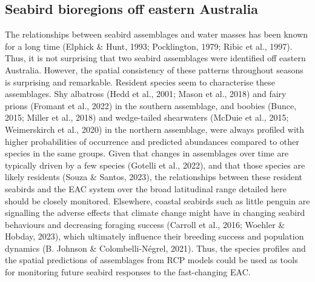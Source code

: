 \documentclass{article}
\begin{document}
\begin{linenumbers}
\hypertarget{seabird-bioregions-off-eastern-australia}{%
\subsection{Seabird bioregions off eastern Australia}\label{seabird-bioregions-off-eastern-australia}}

The relationships between seabird assemblages and water masses has been known for a long time (Elphick \& Hunt, 1993; Pocklington, 1979; Ribic et al., 1997). Thus, it is not surprising that two seabird assemblages were identified off eastern Australia. However, the spatial consistency of these patterns throughout seasons is surprising and remarkable. Resident species seem to characterise these assemblages. Shy albatross (Hedd et al., 2001; Mason et al., 2018) and fairy prions (Fromant et al., 2022) in the southern assemblage, and boobies (Bunce, 2015; Miller et al., 2018) and wedge-tailed shearwaters (McDuie et al., 2015; Weimerskirch et al., 2020) in the northern assemblage, were always profiled with higher probabilities of occurrence and predicted abundances compared to other species in the same groups. Given that changes in assemblages over time are typically driven by a few species (Gotelli et al., 2022), and that those species are likely residents (Souza \& Santos, 2023), the relationships between these resident seabirds and the EAC system over the broad latitudinal range detailed here should be closely monitored. Elsewhere, coastal seabirds such as little penguin are signalling the adverse effects that climate change might have in changing seabird behaviours and decreasing foraging success (Carroll et al., 2016; Woehler \& Hobday, 2023), which ultimately influence their breeding success and population dynamics (B. Johnson \& Colombelli-Négrel, 2021). Thus, the species profiles and the spatial predictions of assemblages from RCP models could be used as tools for monitoring future seabird responses to the fast-changing EAC.


\end{linenumbers}
\end{document}
